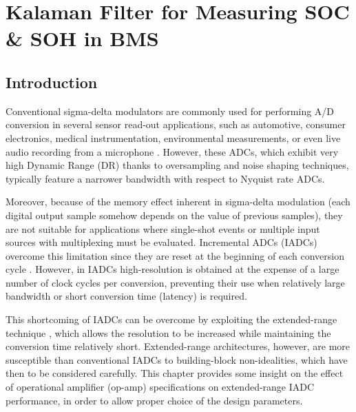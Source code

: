 \chapter{Kalaman Filter for Measuring SOC \& SOH in BMS}
\section{Introduction}

Conventional sigma-delta modulators are commonly used for performing A/D conversion in several sensor read-out applications, such as automotive, consumer electronics, medical instrumentation, environmental measurements, or even live audio recording from a microphone \cite{ESSCIRC_GUINEA}. However, these ADCs, which exhibit very high Dynamic Range (DR) thanks to oversampling and noise shaping techniques, typically feature a narrower bandwidth with respect to Nyquist rate ADCs.

Moreover, because of the memory effect inherent in sigma-delta modulation (each digital output sample somehow depends on the value of previous samples), they are not suitable for applications where single-shot events or multiple input sources with multiplexing must be evaluated.
Incremental ADCs (IADCs) overcome this limitation since they are reset at the beginning of each conversion cycle \cite{PRIME_CAVALLO}. However, in IADCs high-resolution is obtained at the expense of a large number of clock cycles per conversion, preventing their use when relatively large bandwidth or short conversion time (latency) is required.

This shortcoming of IADCs can be overcome by exploiting the extended-range technique \cite{JSSC_CHEN}\cite{ISSCC_KIM}\cite{PRIME_MOATAZ}\cite{ICICDT_CAVALLO}\cite{ISVC_AGAH}, which allows the resolution to be increased while maintaining the conversion time relatively short. Extended-range architectures, however, are more susceptible than conventional IADCs to building-block non-idealities, which have then to be considered carefully. This chapter provides some insight on the effect of operational amplifier (op-amp) specifications on extended-range IADC performance, in order to allow proper choice of the design parameters. 

